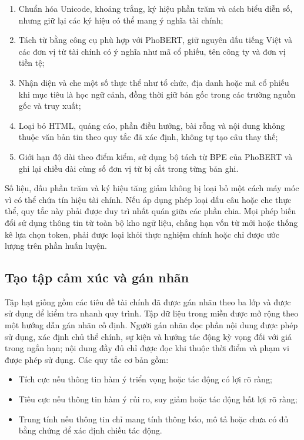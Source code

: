 \documentclass[12pt, a4paper, oneside]{report}
\begin{document}
\begin{enumerate}[nosep]
  \item Chuẩn hóa Unicode, khoảng trắng, ký hiệu phần trăm và cách biểu diễn số, nhưng
    giữ lại các ký hiệu có thể mang ý nghĩa tài chính;
  \item Tách từ bằng công cụ phù hợp với PhoBERT, giữ nguyên dấu tiếng Việt và các đơn
    vị từ tài chính có ý nghĩa như mã cổ phiếu, tên công ty và đơn vị tiền tệ;
  \item Nhận diện và che một số thực thể như tổ chức, địa danh hoặc mã cổ phiếu khi
    mục tiêu là học ngữ cảnh, đồng thời giữ bản gốc trong các trường nguồn gốc và
    truy xuất;
  \item Loại bỏ HTML, quảng cáo, phần điều hướng, bài rỗng và nội dung không thuộc văn
    bản tin theo quy tắc đã xác định, không tự tạo câu thay thế;
  \item Giới hạn độ dài theo điểm kiểm, sử dụng bộ tách từ BPE của PhoBERT và ghi lại
    chiều dài cùng số đơn vị từ bị cắt trong từng bản ghi.
\end{enumerate}

Số liệu, dấu phần trăm và ký hiệu tăng giảm không bị loại bỏ một cách máy móc vì có thể
chứa tín hiệu tài chính. Nếu áp dụng phép loại dấu câu hoặc che thực thể, quy tắc này
phải được duy trì nhất quán giữa các phần chia. Mọi phép biến đổi sử dụng thông tin từ
toàn bộ kho ngữ liệu, chẳng hạn vốn từ mới hoặc thống kê lựa chọn token, phải được loại
khỏi thực nghiệm chính hoặc chỉ được ước lượng trên phần huấn luyện.

\subsection{Tạo tập cảm xúc và gán nhãn}

Tập hạt giống gồm các tiêu đề tài chính đã được gán nhãn theo ba lớp và được sử dụng
để kiểm tra nhanh quy trình. Tập dữ liệu trong miền được mở rộng theo một hướng dẫn
gán nhãn cố định. Người gán nhãn đọc phần nội dung được phép sử dụng, xác định chủ thể
chính, sự kiện và hướng tác động kỳ vọng đối với giá trong ngắn hạn; nội dung đầy đủ
chỉ được đọc khi thuộc thời điểm và phạm vi được phép sử dụng. Các quy tắc cơ bản gồm:

\begin{itemize}[nosep]
  \item Tích cực nếu thông tin hàm ý triển vọng hoặc tác động có lợi rõ ràng;
  \item Tiêu cực nếu thông tin hàm ý rủi ro, suy giảm hoặc tác động bất lợi rõ ràng;
  \item Trung tính nếu thông tin chỉ mang tính thông báo, mô tả hoặc chưa có đủ bằng
    chứng để xác định chiều tác động.
\end{itemize}
\end{document}
